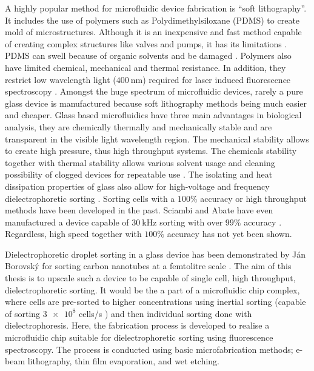 \documentclass[final]{jyflluk}
\begin{document}
A highly popular method for microfluidic device fabrication is “soft lithography”. It includes the use of polymers such as Polydimethylsiloxane (PDMS) to create mold of microstructures. Although it is an inexpensive and fast method capable of creating complex structures like valves and pumps, it has its limitations \cite{xia_soft_1998,tian2008introduction, pethig_review_2010, grover_monolithic_2003}. PDMS can swell because of organic solvents and be damaged \cite{lee_solvent_2003}. Polymers also have limited chemical, mechanical and thermal resistance. In addition, they restrict low wavelength light ($\SI{400}{\nano \metre}$) required for laser induced fluorescence spectroscopy \cite{tian2008introduction,stankova_optical_2016}. Amongst the huge spectrum of microfluidic devices, rarely a pure glass device is manufactured because soft lithography methods being much easier and cheaper. Glass based microfluidics have three main advantages in biological analysis, they are chemically thermally and mechanically stable and are transparent in the visible light wavelength region. The mechanical stability allows to create high pressure, thus high throughput systems. The chemicals stability together with thermal stability allows various solvent usage and cleaning possibility of clogged devices for repeatable use \cite{ofner_high-throughput_2017}. The isolating and heat dissipation properties of glass also allow for high-voltage and frequency dielectrophoretic sorting \cite{effenhauser_high-speed_1994}.
Sorting cells with a $100 \percent$ accuracy \cite{takahashi_non-destructive_2004, thomas_imagebased_2019} or high throughput methods \cite{zhang_towards_2015} have been developed in the past. Sciambi and Abate have even manufactured a device capable of $\SI{30}{\kilo \Hz}$ sorting with over $99 \percent$ accuracy \cite{sciambi2015accurate}. Regardless, high speed together with $100\percent$ accuracy has not yet been shown.

Dielectrophoretic droplet sorting in a glass device has been demonstrated by Ján Borovský for sorting carbon nanotubes at a femtolitre scale \cite{borovsky}. The aim of this thesis is to upscale such a device to be capable of single cell, high throughput, dielectrophoretic sorting. It would be the a part of a microfluidic chip complex, where cells are pre-sorted to higher concentrations using inertial sorting (capable of sorting $\num{3e8}$ cells/s \cite{edd_microfluidic_2020}) and then individual sorting done with dielectrophoresis. Here, the fabrication process  is developed to realise a microfluidic chip suitable for dielectrophoretic sorting using fluorescence spectroscopy. The process is conducted using basic microfabrication methods; e-beam lithography, thin film evaporation, and wet etching.
\end{document}
